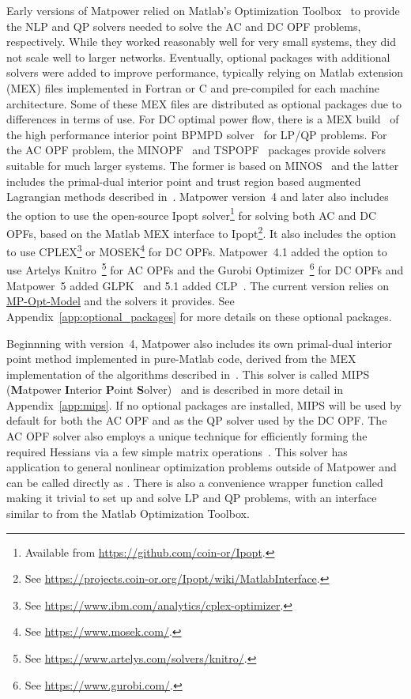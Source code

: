 \documentclass[12pt]{article}
\newcommand{\matlab}[0]{{\sc Matlab}}
\newcommand{\matpower}[0]{{\sc Matpower}}
\newcommand{\mips}[0]{{MIPS}}
\newcommand{\mipsname}[0]{{{\bf M}{\sc atpower} \textbf{I}nterior \textbf{P}oint \textbf{S}olver}}
\newcommand{\mpom}[0]{{MP-Opt-Model}}
\newcommand{\mpomurl}[0]{https://github.com/MATPOWER/mp-opt-model}
\newcommand{\mpomlink}[0]{\href{\mpomurl}{\mpom{}}}
\newcommand{\ipopt}[0]{{\sc Ipopt}}
\newcommand{\knitro}[0]{{Artelys Knitro}}
\newcommand{\clp}[0]{{CLP}}
\newcommand{\cplex}[0]{{CPLEX}}
\newcommand{\glpk}[0]{{GLPK}}
\newcommand{\gurobi}[0]{{Gurobi}}
\newcommand{\mosek}[0]{{MOSEK}}
\newcommand{\ot}[0]{{Optimization Toolbox}}
\newcommand{\code}[1]{{\relsize{-0.5}{\tt{{#1}}}}}  %
\numberwithin{equation}{section}
\numberwithin{table}{section}
\numberwithin{figure}{section}
\begin{document}
Early versions of \matpower{} relied on \matlab{}'s \ot{}~\cite{ot} to provide the NLP and QP solvers needed to solve the AC and DC OPF problems, respectively. While they worked reasonably well for very small systems, they did not scale well to larger networks. Eventually, optional packages with additional solvers were added to improve performance, typically relying on \matlab{} extension (MEX) files implemented in Fortran or C and pre-compiled for each machine architecture. Some of these MEX files are distributed as optional packages due to differences in terms of use. For DC optimal power flow, there is a MEX build~\cite{bpmpdmex} of the high performance interior point BPMPD solver~\cite{meszaros1996} for LP/QP problems. For the AC OPF problem, the MINOPF~\cite{minopf} and TSPOPF~\cite{tspopf} packages provide solvers suitable for much larger systems. The former is based on MINOS~\cite{murtagh} and the latter includes the primal-dual interior point and trust region based augmented Lagrangian methods described in~\cite{wang2007a}. \matpower{} version~4 and later also includes the option to use the open-source \ipopt{} solver\footnote{Available from \url{https://github.com/coin-or/Ipopt}.} for solving both AC and DC OPFs, based on the \matlab{} MEX interface to \ipopt{}\footnote{See \url{https://projects.coin-or.org/Ipopt/wiki/MatlabInterface}.}. It also includes the option to use \cplex{}\footnote{See \url{https://www.ibm.com/analytics/cplex-optimizer}.} or \mosek{}\footnote{See \url{https://www.mosek.com/}.} for DC OPFs. \matpower{}~4.1 added the option to use \knitro{}~\cite{knitro}\footnote{See \url{https://www.artelys.com/solvers/knitro/}.} for AC OPFs and the \gurobi{} Optimizer~\cite{gurobi}\footnote{See \url{https://www.gurobi.com/}.} for DC OPFs and \matpower{}~5 added \glpk{}~\cite{glpk} and 5.1 added \clp{}~\cite{clp}. The current version relies on \mpomlink{} and the solvers it provides. See Appendix~\ref{app:optional_packages} for more details on these optional packages.

Beginnning with version~4, \matpower{} also includes its own primal-dual interior point method implemented in pure-\matlab{} code, derived from the MEX implementation of the algorithms described in~\cite{wang2007a}. This solver is called \mips{} (\mipsname{})~\cite{mips} and is described in more detail in Appendix~\ref{app:mips}. If no optional packages are installed, \mips{} will be used by default for both the AC OPF and as the QP solver used by the DC OPF. The AC OPF solver also employs a unique technique for efficiently forming the required Hessians via a few simple matrix operations~\cite{zimmerman2010b, sereeter2018a, sereeter2018b}. This solver has application to general nonlinear optimization problems outside of \matpower{} and can be called directly as \code{mips}. There is also a convenience wrapper function called \code{qps\_mips} making it trivial to set up and solve LP and QP problems, with an interface similar to \code{quadprog} from the \matlab{} \ot{}.
\end{document}
